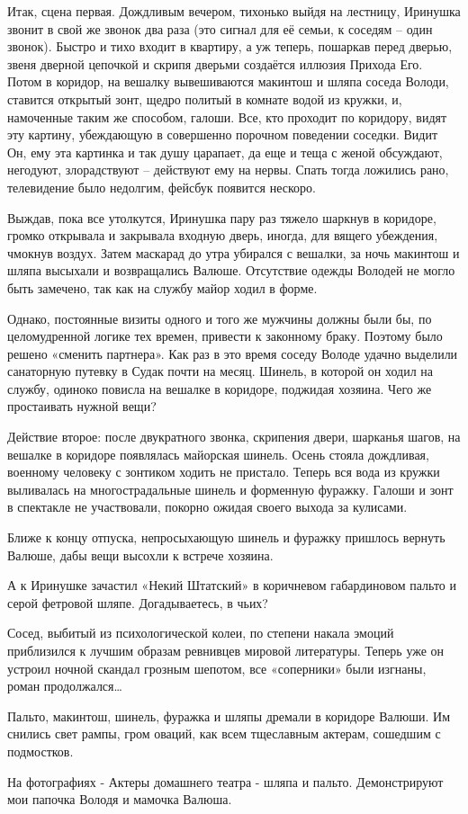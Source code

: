 Итак, сцена первая. Дождливым вечером, тихонько выйдя на лестницу, Иринушка
звонит в свой же звонок два раза (это сигнал для её семьи, к соседям – один
звонок). Быстро и тихо входит в квартиру, а уж теперь, пошаркав перед дверью,
звеня дверной цепочкой и скрипя дверьми создаётся иллюзия Прихода Его. Потом в
коридор, на вешалку вывешиваются макинтош и шляпа соседа Володи, ставится
открытый зонт, щедро политый в комнате водой из кружки, и, намоченные таким же
способом, галоши. Все, кто проходит по коридору, видят эту картину, убеждающую
в совершенно порочном поведении соседки. Видит Он, ему эта картинка и так душу
царапает, да еще и теща с женой обсуждают, негодуют, злорадствуют – действуют
ему на нервы. Спать тогда ложились рано, телевидение было недолгим, фейсбук
появится нескоро.

Выждав, пока все утолкутся, Иринушка пару раз тяжело шаркнув в коридоре, громко
открывала и закрывала входную дверь, иногда, для вящего убеждения, чмокнув
воздух. Затем маскарад до утра убирался с вешалки, за ночь макинтош и шляпа
высыхали и возвращались Валюше. Отсутствие одежды Володей не могло быть
замечено, так как на службу майор ходил в форме.

Однако, постоянные визиты одного и того же мужчины должны были бы, по
целомудренной логике тех времен, привести к законному браку. Поэтому было
решено «сменить партнера». Как раз в это время соседу Володе удачно выделили
санаторную путевку в Судак почти на месяц. Шинель, в которой он ходил на
службу, одиноко повисла на вешалке в коридоре, поджидая хозяина. Чего же
простаивать нужной вещи?

Действие второе: после двукратного звонка, скрипения двери, шарканья шагов, на
вешалке в коридоре появлялась майорская шинель. Осень стояла дождливая,
военному человеку с зонтиком ходить не пристало. Теперь вся вода из кружки
выливалась на многострадальные шинель и форменную фуражку. Галоши и зонт в
спектакле не участвовали, покорно ожидая своего выхода за кулисами.

Ближе к концу отпуска, непросыхающую шинель и фуражку пришлось вернуть Валюше,
дабы вещи высохли к встрече хозяина.

А к Иринушке зачастил «Некий Штатский» в коричневом габардиновом пальто и серой
фетровой шляпе. Догадываетесь, в чьих?

Сосед, выбитый из психологической колеи, по степени накала эмоций приблизился к
лучшим образам ревнивцев мировой литературы. Теперь уже он устроил ночной
скандал грозным шепотом, все «соперники» были изгнаны, роман продолжался…

Пальто, макинтош, шинель, фуражка и шляпы дремали в коридоре Валюши. Им снились
свет рампы, гром оваций, как всем тщеславным актерам, сошедшим с подмостков.

На фотографиях - Актеры домашнего театра - шляпа и пальто. Демонстрируют мои
папочка Володя и мамочка Валюша.
